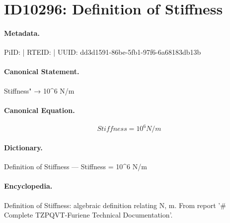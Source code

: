 \section*{ID10296: Definition of Stiffness}
\paragraph{Metadata.}
PiID:  | RTEID:  | UUID: dd3d1591-86be-5fb1-97f6-6a68183db13b

\paragraph{Canonical Statement.}
Stiffness" → 10\textasciicircum{}6 N/m

\paragraph{Canonical Equation.}
\[
Stiffness = 10^6 N/m
\]

\paragraph{Dictionary.}
Definition of Stiffness — Stiffness = 10\textasciicircum{}6 N/m

\paragraph{Encyclopedia.}
Definition of Stiffness: algebraic definition relating N, m. From report '\# Complete TZPQVT-Furiene Technical Documentation'.
